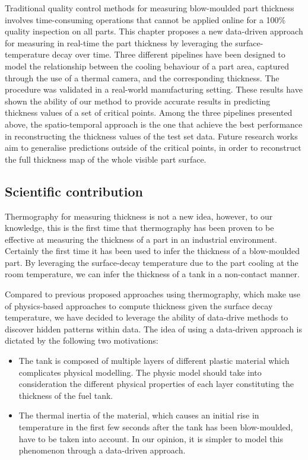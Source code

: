 Traditional quality control methods for measuring blow-moulded part thickness involves time-consuming operations that cannot be applied online for a 100\% quality inspection on all parts. This chapter proposes a new data-driven approach for measuring in real-time the part thickness by leveraging the surface-temperature decay over time. Three different pipelines have been designed to model the relationship between the cooling behaviour of a part area, captured through the use of a thermal camera, and the corresponding thickness. The procedure was validated in a real-world manufacturing setting. These results have shown the ability of our method to provide accurate results in predicting thickness values of a set of critical points. Among the three pipelines presented above, the spatio-temporal approach is the one that achieve the best performance in reconstructing the thickness values of the test set data. Future research works aim to generalise predictions outside of the critical points, in order to reconstruct the full thickness map of the whole visible part surface.

\subsection{Scientific contribution}

Thermography for measuring thickness is not a new idea, however, to our knowledge, this is the first time that thermography has been proven to be effective at measuring the thickness of a part in an industrial environment. Certainly the first time it has been used to infer the thickness of a blow-moulded part. By leveraging the surface-decay temperature due to the part cooling at the room temperature, we can infer the thickness of a tank in a non-contact manner.

Compared to previous proposed approaches using thermography, which make use of physics-based approaches to compute thickness given the surface decay temperature, we have decided to leverage the ability of data-drive methods to discover hidden patterns within data. The idea of using a data-driven approach is dictated by the following two motivations:

\begin{itemize}
    \item The tank is composed of multiple layers of different plastic material which complicates physical modelling. The physic model should take into consideration the different physical properties of each layer constituting the thickness of the fuel tank.
    \item The thermal inertia of the material, which causes an initial rise in temperature in the first few seconds after the tank has been blow-moulded, have to be taken into account. In our opinion, it is simpler to model this phenomenon through a data-driven approach. 
\end{itemize}


